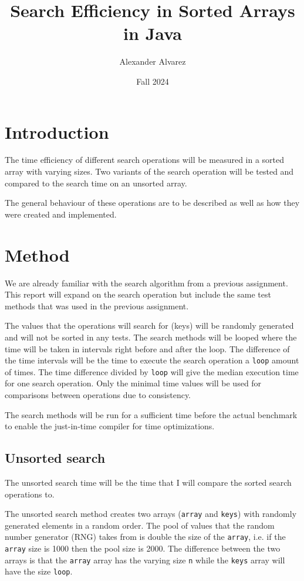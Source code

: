 \documentclass[a4paper,11pt]{article}
\begin{document}
\title{
  \textbf{Search Efficiency in Sorted Arrays in Java}
}
\author{Alexander Alvarez}
\date{Fall 2024}

\maketitle

\section*{Introduction}

The time efficiency of different search operations will be measured in 
a sorted array with varying sizes. Two variants of the search operation
will be tested and compared to the search time on an unsorted array.

The general behaviour of these operations are to be described as well
as how they were created and implemented.

\section*{Method}

We are already familiar with the search algorithm from a previous
assignment. This report will expand on the search operation but
include the same test methods that was used in the previous
assignment. 

The values that the operations will search for (keys) will be randomly
generated and will not be sorted in any tests. The search methods will
be looped where the time will be taken in intervals right before and 
after the loop. The difference of the time intervals will be the time
to execute the search operation a {\tt loop} amount of times. The 
time difference divided by {\tt loop} will give the median execution 
time for one search operation. Only the minimal time values will be 
used for comparisons between operations due to consistency.

The search methods will be run for a sufficient time before the actual 
benchmark to enable the just-in-time compiler for time optimizations.

\subsection*{Unsorted search}

The unsorted search time will be the time that I will compare the
sorted search operations to. 

The unsorted search method creates two arrays ({\tt array} and 
{\tt keys}) with randomly generated elements in a random order. The 
pool of values that the random number generator (RNG) takes from is 
double the size of the {\tt array}, i.e. if the {\tt array} size is 
1000 then the pool size is 2000. The difference between the two arrays 
is that the {\tt array} array has the varying size {\tt n} while the 
{\tt keys} array will have the size {\tt loop}. 
\end{document}
